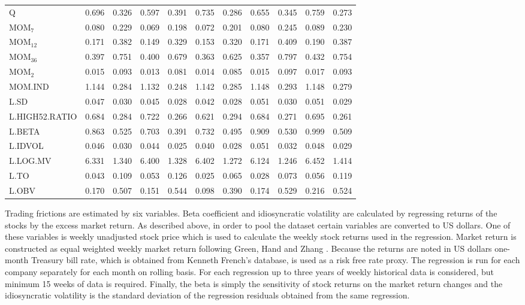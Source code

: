 \documentclass{article}
\begin{document}
\begin{table}[ht]
\begin{tabularx}{\textwidth}{@{\extracolsep{1pt}} X r r r r r r r r r r}
Q			& 0.696 	& 0.326	& 0.597 	& 0.391	& 0.735	& 0.286	& 0.655	& 0.345	& 0.759 	& 0.273 \\
MOM$_{7}$ 	& 0.080 	& 0.229	& 0.069 	& 0.198	& 0.072	& 0.201	& 0.080	& 0.245	& 0.089	& 0.230 \\
MOM$_{12}$ 	& 0.171	& 0.382	& 0.149 	& 0.329	& 0.153	& 0.320	& 0.171	& 0.409	& 0.190	& 0.387 \\
MOM$_{36}$ 	& 0.397	& 0.751	& 0.400 	& 0.679	& 0.363	& 0.625	& 0.357	& 0.797	& 0.432	& 0.754 \\
MOM$_{2}$ 	& 0.015 	& 0.093	& 0.013 	& 0.081	& 0.014	& 0.085	& 0.015	& 0.097	& 0.017	& 0.093 \\ 
MOM.IND 	& 1.144 	& 0.284	& 1.132 	& 0.248	& 1.142	& 0.285	& 1.148	& 0.293	& 1.148	& 0.279 \\
L.SD	 		& 0.047	& 0.030	& 0.045 	& 0.028	& 0.042	& 0.028	& 0.051	& 0.030	& 0.051	& 0.029 \\
L.HIGH52.RATIO & 0.684 & 0.284	& 0.722 	& 0.266	& 0.621	& 0.294	& 0.684	& 0.271	& 0.695	& 0.261 \\
L.BETA	 	& 0.863 	& 0.525	& 0.703 	& 0.391	& 0.732	& 0.495	& 0.909	& 0.530	& 0.999	& 0.509 \\
L.IDVOL	 	& 0.046 	& 0.030	& 0.044 	& 0.025	& 0.040	& 0.028	& 0.051	& 0.032	& 0.048	& 0.029 \\ 
L.LOG.MV	& 6.331  	& 1.340	& 6.400 	& 1.328	& 6.402	& 1.272	& 6.124	& 1.246	& 6.452	& 1.414 \\ 
L.TO		 	& 0.043  	& 0.109	& 0.053 	& 0.126	& 0.025	& 0.065	& 0.028	& 0.073	& 0.056	& 0.119 \\
L.OBV		& 0.170 	& 0.507	& 0.151 	& 0.544	& 0.098	& 0.390	& 0.174	& 0.529	& 0.216	& 0.524 \\ 
\bottomrule
\end{tabularx}
\end{table} 

Trading frictions are estimated by six variables. Beta coefficient and idiosyncratic volatility are calculated by regressing returns of the stocks by the excess market return. As described above, in order to pool the dataset certain variables are converted to US dollars. One of these variables is weekly unadjusted stock price which is used to calculate the weekly stock returns used in the regression. Market return is constructed as equal weighted weekly market return following Green, Hand and Zhang \citeyear{Green2017}. Because the returns are noted in US dollars one-month Treasury bill rate, which is obtained from Kenneth French's database\footnotemark, is used as a risk free rate proxy. The regression is run for each company separately for each month on rolling basis. For each regression up to three years of weekly historical data is considered, but minimum 15 weeks of data is required. Finally, the beta is simply the sensitivity of stock returns on the market return changes and the idiosyncratic volatility is the standard deviation of the regression residuals obtained from the same regression. \par
\end{document}
